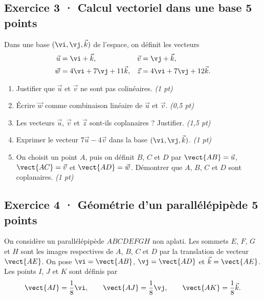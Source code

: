 \clearpage{}\par

\subsection*{Exercice 3 · Calcul vectoriel dans une base \hfill 5 points}Dans une base $(\vi,\vj,\vec k)$ de l'espace, on définit les vecteurs
\[\begin{aligned}\vec u&=\vi+\vec k,&\vec v&=\vj+\vec k,\\
\vec w&=4\vi+7\vj+11\vec k,&\vec z&=4\vi+7\vj+12\vec k.\end{aligned}\]

\begin{enumerate}

\item Justifier que $\vec u$ et $\vec v$ ne sont pas colinéaires. \hfill\textit{(1 pt)}

\item Écrire $\vec w$ comme combinaison linéaire de $\vec u$ et $\vec v$. \hfill\textit{(0,5 pt)}

\item Les vecteurs $\vec u$, $\vec v$ et $\vec z$ sont-ils coplanaires ? Justifier. \hfill\textit{(1,5 pt)}

\item Exprimer le vecteur $7\vec u-4\vec v$ dans la base $(\vi,\vj,\vec k)$. \hfill\textit{(1 pt)}

\item On choisit un point $A$, puis on définit $B$, $C$ et $D$ par $\vect{AB}=\vec u$, $\vect{AC}=\vec v$ et $\vect{AD}=\vec w$. Démontrer que $A$, $B$, $C$ et $D$ sont coplanaires. \hfill\textit{(1 pt)}

\end{enumerate}

\subsection*{Exercice 4 · Géométrie d'un parallélépipède \hfill 5 points}On considère un parallélépipède $ABCDEFGH$ non aplati. Les sommets $E$, $F$, $G$ et $H$ sont les images respectives de $A$, $B$, $C$ et $D$ par la translation de vecteur $\vect{AE}$.
On pose $\vi=\vect{AB}$, $\vj=\vect{AD}$ et $\vec k=\vect{AE}$.
Les points $I$, $J$ et $K$ sont définis par
\[\vect{AI}=\frac1{8}\vi,\qquad\vect{AJ}=\frac1{8}\vj,\qquad\vect{AK}=\frac1{8}\vec k.\]

